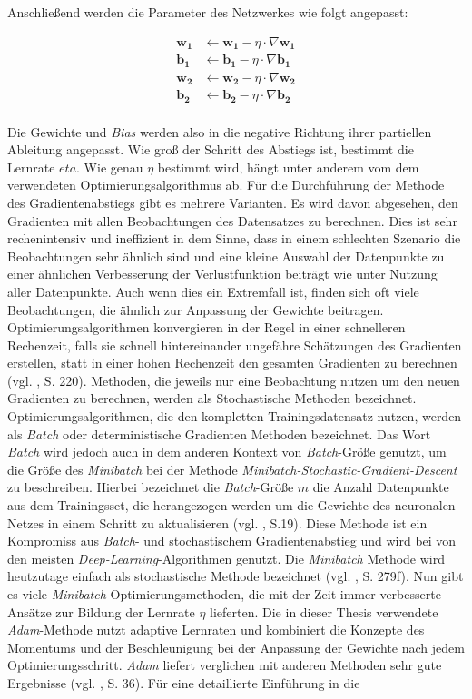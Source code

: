 \documentclass[a4paper,11pt]{article}
\begin{document}
Anschließend werden die Parameter des Netzwerkes wie folgt angepasst:

\begin{align*}
   \bm{w_1} &\leftarrow \bm{w_1} - \eta \cdot \nabla \bm{w_1} \\
\bm{b_1} &\leftarrow \bm{b_1} - \eta \cdot \nabla \bm{b_1} \\
 \bm{w_2} &\leftarrow \bm{w_2} - \eta \cdot \nabla \bm{w_2} \\
    \bm{b_2} &\leftarrow \bm{b_2} - \eta \cdot \nabla \bm{b_2} \\
\end{align*}{}

Die Gewichte und \textit{Bias} werden also in die negative Richtung ihrer partiellen Ableitung angepasst. Wie groß der Schritt des Abstiegs ist, bestimmt die Lernrate $eta$. 
Wie genau $\eta$ bestimmt wird, hängt unter anderem vom dem verwendeten Optimierungsalgorithmus ab. Für die Durchführung der Methode des Gradientenabstiegs gibt es mehrere Varianten. Es wird davon abgesehen, den Gradienten mit allen Beobachtungen des Datensatzes zu berechnen. Dies ist sehr rechenintensiv und ineffizient in dem Sinne, dass in einem schlechten Szenario die Beobachtungen sehr ähnlich sind und eine kleine Auswahl der Datenpunkte zu einer ähnlichen Verbesserung der Verlustfunktion beiträgt wie unter Nutzung aller Datenpunkte. Auch wenn dies ein Extremfall ist, finden sich oft viele Beobachtungen, die ähnlich zur Anpassung der Gewichte beitragen. Optimierungsalgorithmen konvergieren in der Regel in einer schnelleren Rechenzeit, falls sie schnell hintereinander ungefähre Schätzungen des Gradienten erstellen, statt in einer hohen Rechenzeit den gesamten Gradienten zu berechnen (vgl. \cite{deepEssentials}, S. 220). Methoden, die jeweils nur eine Beobachtung nutzen um den neuen Gradienten zu berechnen, werden als Stochastische Methoden bezeichnet. Optimierungsalgorithmen, die den kompletten Trainingsdatensatz nutzen, werden als \textit{Batch} oder deterministische Gradienten Methoden bezeichnet. Das Wort \textit{Batch} wird jedoch auch in dem anderen Kontext von \textit{Batch}-Größe genutzt, um die Größe des \textit{Minibatch} bei der Methode \textit{Minibatch-Stochastic-Gradient-Descent} zu beschreiben. Hierbei bezeichnet die \textit{Batch}-Größe $m$ die Anzahl Datenpunkte aus dem Trainingsset, die herangezogen werden um die Gewichte des neuronalen Netzes in einem Schritt zu aktualisieren (vgl. \cite{keras}, S.19). Diese Methode ist ein Kompromiss aus \textit{Batch}- und stochastischem Gradientenabstieg und wird bei von den meisten \textit{Deep-Learning}-Algorithmen genutzt. Die \textit{Minibatch} Methode wird heutzutage einfach als stochastische Methode bezeichnet (vgl. \cite{deepL}, S. 279f). Nun gibt es viele \textit{Minibatch} Optimierungsmethoden, die mit der Zeit immer verbesserte Ansätze zur Bildung der Lernrate $\eta$ lieferten. Die in dieser Thesis verwendete \textit{Adam}-Methode nutzt adaptive Lernraten und kombiniert die Konzepte des Momentums und der Beschleunigung bei der Anpassung der Gewichte nach jedem Optimierungsschritt. \textit{Adam} liefert verglichen mit anderen Methoden sehr gute Ergebnisse (vgl. \cite{keras}, S. 36). Für eine detaillierte Einführung in die 
\end{document}
